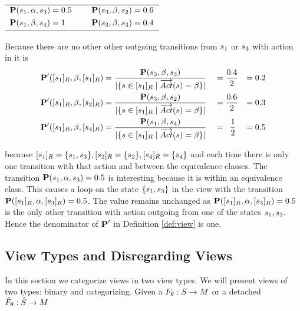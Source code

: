 \documentclass[preview]{standalone}
\begin{document}
\begin{exmp}
\begin{center}
	\begin{tabular}{lcl}
 ${{\textbf{P}}}({s}_1,{\alpha},{s}_3) = 0.5$& \quad\quad &	${{\textbf{P}}}({s}_3,{\beta},{s}_2) = 0.6$ \\
 ${{\textbf{P}}}({s}_1,{\beta},{s}_4) = 1$ & \quad\quad &	${{\textbf{P}}}({s}_3,{\beta},{s}_3) = 0.4$ \\
	\end{tabular}
\end{center}

Because there are no other other outgoing transitions from ${s}_1$ or ${s}_3$ with action \actionb in \view it is 
\begin{alignat*}{4}
	{\ensuremath{{\textbf{P}}}}'({{[{s}_1]_{{R}}}}, {\beta}, {{[{s}_1]_{{R}}}}) &= \frac{{{\textbf{P}}}({s}_3,{\beta},{s}_3)}{|\{{s} \in {\ensuremath{{[{s}_1]_{{R}}}}} \mid {\overrightarrow{\ensuremath{{Act}}}}({s}) = {\beta}\}|} &&= \frac{0.4}{2} &= 0.2\\
	{{\textbf{P}}}'({{[{s}_1]_{{R}}}}, {\beta}, {{[{s}_2]_{{R}}}}) &= \frac{{{\textbf{P}}}({s}_3,{\beta},{s}_2)}{|\{{s} \in {\ensuremath{{[{s}_1]_{{R}}}}} \mid {\overrightarrow{\ensuremath{{Act}}}}({s}) = {\beta}\}|} &&= \frac{0.6}{2} &= 0.3\\
	{{\textbf{P}}}'({{[{s}_1]_{{R}}}}, {\beta}, {{[{s}_4]_{{R}}}}) &= \frac{{{\textbf{P}}}({s}_1,{\beta},{s}_4)}{|\{{s} \in {\ensuremath{{[{s}_1]_{{R}}}}} \mid {\overrightarrow{\ensuremath{{Act}}}}({s}) = {\beta}\}|} &&= \;\:\frac{1}{2} &= 0.5
\end{alignat*}

because ${{[{s}_1]_{{R}}}} = \{{s}_1, {s}_3\}, {{[{s}_2]_{{R}}}} = \{{s}_2\}, {{[{s}_4]_{{R}}}} = \{{s}_4\}$ and each time there is only one transition with that action and   between the equivalence classes. The transition ${{\textbf{P}}}({s}_1,{\alpha},{s}_3) = 0.5$ is interesting because it is within an equivalence class. This causes a loop on the state $\{{s}_1,{s}_3\}$ in the view \view with the transition ${{\textbf{P}}}({{[{s}_1]_{{R}}}},{\alpha},{{[{s}_3]_{{R}}}}) = 0.5$. The value remains unchanged as ${{\textbf{P}}}({{[{s}_1]_{{R}}}},{\alpha},{{[{s}_3]_{{R}}}}) = 0.5$ is the only other transition with action \action outgoing from one of the states ${s}_1,{s}_3$. Hence the denominator of ${{\textbf{P}}}'$ in Definition \ref{def:view} is one.
\end{exmp}

\subsection{View Types and Disregarding Views}
In this section we categorize views in two view types. We will present views of two types: binary and categorizing. Given a \grpfctN ${F_{{\theta}}} : {S} \to {\ensuremath{{M}}}$ or a detached \grpfctN ${\tilde{F}_{{\theta}}} : {\tilde{{S}}} \to {\ensuremath{{M}}}$
\end{document}
